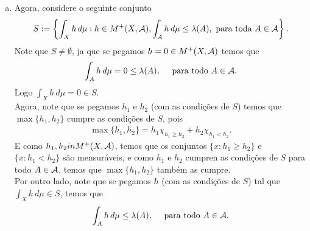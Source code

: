 \begin{homeworkProblem}[6]
\begin{solution}
\begin{enumerate}[a)]
\begin{itemize}
          \begin{align*}
            \lambda(X\setminus P)=0.
          \end{align*}
          Portanto, temos que $\lambda(X\setminus P)=\mu(P)=0$ com $X\setminus P,P\in \cali{A}$ tais que $(X\setminus P)\cap P=\emptyset$ e $(X\setminus P)\cup P=X$. Pelo que temos que $\lambda\perp\mu$.
        \item Agora, suponha que $\mu(P)\neq 0$, logo temos que
          \begin{align*}
            0\neq \mu(P) \leq \sum_{n=1}^{\infty}\mu(P_n).
          \end{align*}
          Logo como $\mu$ é medida positiva, temos que existe $m\in\mathbb{Z}^{+}$ tal que $\mu(P_m)> 0$. Sendo assim, defina $\epsilon=\frac{1}{m}>0$ e $A=P_m\in\cali{A}$. Logo, pelo anterior temos que $\mu(A)>0$ e $\left( \lambda-\epsilon\mu \right)(A)\geq 0$.
      \end{itemize}
    \item Agora, considere o seguinte conjunto
      \begin{align*}
        S:=\left\{ \int_{X}h\,d\mu:h\in M^{+}(X,\mathcal{A}), \int_{A}h\,d\mu\leq \lambda(A),\text{ para toda }A\in\mathcal{A} \right\}.
      \end{align*}
      Note que $S\neq \emptyset$, ja que se pegamos $h=0\in M^{+}(X,\mathcal{A})$ temos que
      \begin{align*}
        \int_{A}h\,d\mu=0\leq \lambda(A),\quad\text{ para todo }A\in\mathcal{A}.
      \end{align*}
      Logo $\int_{X}h\,d\mu=0\in S$.\\
      Agora, note que se pegamos $h_1$ e $h_2$ (com as condições de $S$) temos que $\max\{h_1,h_2\}$ cumpre as condições de $S$, pois
      \begin{align*}
        \max\{h_1,h_2\}=h_1\chi_{h_1\geq h_2}+h_2\chi_{h_1<h_2}.
      \end{align*}
      E como $h_1,h_2in M^{+}(X,\mathcal{A})$, temos que os conjuntos $\{x:h_1\geq h_2\}$ e $\{x:h_1<h_2\}$ são mensuráveis, e como $h_1$ e $h_2$ cumpren as condições de $S$ para todo $A\in\mathcal{A}$, temos que $\max\{h_1,h_2\}$ também as cumpre.\\
      Por outro lado, note que se pegamos $h$ (com as condições de $S$) tal que $\int_{X}h\,d\mu \in S$, temos que
      \begin{align*}
        \int_{A}h\,d\mu\leq\lambda(A),\quad\text{ para todo }A\in\mathcal{A}.
      \end{align*}

\end{enumerate}
\end{solution}
\end{homeworkProblem}
